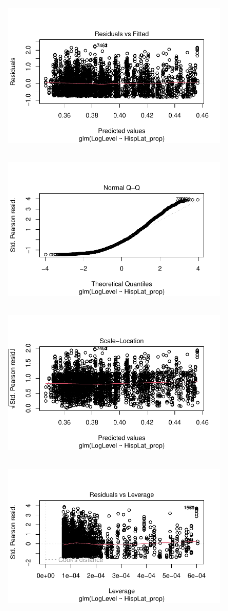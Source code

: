 \documentclass[
  letterpaper,
  DIV=11,
  numbers=noendperiod]{scrartcl}
\begin{document}
\begin{figure}[H]

{\centering \includegraphics[width=0.5\textwidth,height=\textheight]{appendix_files/figure-pdf/unnamed-chunk-4-5.pdf}

}

\end{figure}

\begin{figure}[H]

{\centering \includegraphics[width=0.5\textwidth,height=\textheight]{appendix_files/figure-pdf/unnamed-chunk-4-6.pdf}

}

\end{figure}

\begin{figure}[H]

{\centering \includegraphics[width=0.5\textwidth,height=\textheight]{appendix_files/figure-pdf/unnamed-chunk-4-7.pdf}

}

\end{figure}

\begin{figure}[H]

{\centering \includegraphics[width=0.5\textwidth,height=\textheight]{appendix_files/figure-pdf/unnamed-chunk-4-8.pdf}

}

\end{figure}
\end{document}
